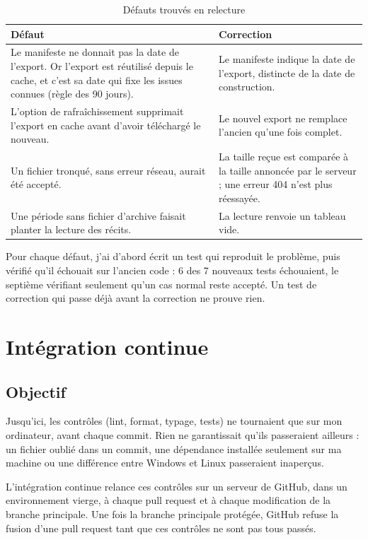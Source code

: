 \documentclass[11pt,a4paper]{article}
\begin{document}
\begin{table}[H]
\centering\small
\begin{tabularx}{\linewidth}{@{}Y Y@{}}
\toprule
Défaut & Correction \\
\midrule
Le manifeste ne donnait pas la date de l'export. Or l'export est réutilisé depuis le cache, et c'est sa date qui fixe les issues connues (règle des 90 jours). & Le manifeste indique la date de l'export, distincte de la date de construction. \\
L'option de rafraîchissement supprimait l'export en cache avant d'avoir téléchargé le nouveau. & Le nouvel export ne remplace l'ancien qu'une fois complet. \\
Un fichier tronqué, sans erreur réseau, aurait été accepté. & La taille reçue est comparée à la taille annoncée par le serveur ; une erreur 404 n'est plus réessayée. \\
Une période sans fichier d'archive faisait planter la lecture des récits. & La lecture renvoie un tableau vide. \\
\bottomrule
\end{tabularx}
\caption{Défauts trouvés en relecture}
\end{table}

Pour chaque défaut, j'ai d'abord écrit un test qui reproduit le problème, puis vérifié qu'il échouait sur l'ancien code : 6 des 7 nouveaux tests échouaient, le septième vérifiant seulement qu'un cas normal reste accepté. Un test de correction qui passe déjà avant la correction ne prouve rien.

\section{Intégration continue}

\subsection{Objectif}

Jusqu'ici, les contrôles (lint, format, typage, tests) ne tournaient que sur mon ordinateur, avant chaque commit. Rien ne garantissait qu'ils passeraient ailleurs : un fichier oublié dans un commit, une dépendance installée seulement sur ma machine ou une différence entre Windows et Linux passeraient inaperçus.

L'intégration continue relance ces contrôles sur un serveur de GitHub, dans un environnement vierge, à chaque pull request et à chaque modification de la branche principale. Une fois la branche principale protégée, GitHub refuse la fusion d'une pull request tant que ces contrôles ne sont pas tous passés.
\end{document}
